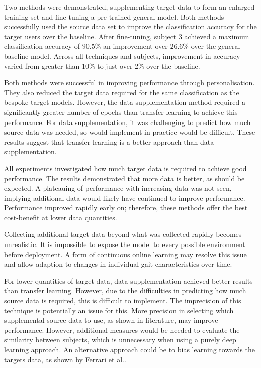 Two methods were demonstrated, supplementing target data to form an enlarged training set and fine-tuning a pre-trained general model. Both methods successfully used the source data set to improve the classification accuracy for the target users over the baseline. After fine-tuning, subject 3 achieved a maximum classification accuracy of $90.5\%$ an improvement over $26.6\%$ over the general baseline model. Across all techniques and subjects, improvement in accuracy varied from greater than 10\% to just over 2\% over the baseline.

Both methods were successful in improving performance through personalisation. They also reduced the target data required for the same classification as the bespoke target models. However, the data supplementation method required a significantly greater number of epochs than transfer learning to achieve this performance. For data supplementation, it was challenging to predict how much source data was needed, so would implement in practice would be difficult. These results suggest that transfer learning is a better approach than data supplementation.

All experiments investigated how much target data is required to achieve good performance. The results demonstrated that more data is better, as should be expected. A plateauing of performance with increasing data was not seen, implying additional data would likely have continued to improve performance. Performance improved rapidly early on; therefore, these methods offer the best cost-benefit at lower data quantities.

Collecting additional target data beyond what was collected rapidly becomes unrealistic. It is impossible to expose the model to every possible environment before deployment. A form of continuous online learning may resolve this issue and allow adaption to changes in individual gait characteristics over time.

For lower quantities of target data, data supplementation achieved better results than transfer learning. However, due to the difficulties in predicting how much source data is required, this is difficult to implement. The imprecision of this technique is potentially an issue for this. More precision in selecting which supplemental source data to use, as shown in literature, may improve performance. However, additional measures would be needed to evaluate the similarity between subjects, which is unnecessary when using a purely deep learning approach. An alternative approach could be to bias learning towards the targets data, as shown by Ferrari et al.\cite{Ferrari2020}.

